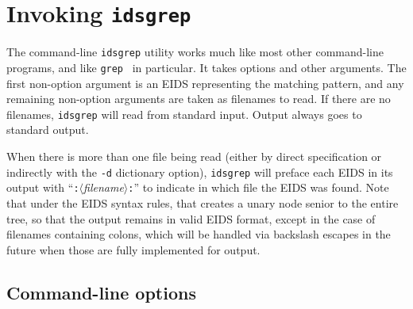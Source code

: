 \documentclass[twocolumn]{report}
\begin{document}

\chapter{Invoking \texttt{idsgrep}}

The command-line \texttt{idsgrep} utility works much like most other
command-line programs, and like \texttt{grep}~\cite{grep} in particular.  It
takes options and other arguments.  The first non-option argument is an EIDS
representing the matching pattern, and any remaining non-option arguments
are taken as filenames to read.  If there are no filenames, \texttt{idsgrep}
will read from standard input.  Output always goes to standard output.

When there is more than one file being read (either by direct specification
or indirectly with the \texttt{-d} dictionary option), \texttt{idsgrep} will
preface each EIDS in its output with
``\texttt{:}$\langle$\textit{filename}$\rangle$\texttt{:}'' to indicate
in which file the EIDS was found.  Note that under the EIDS syntax rules,
that creates a unary node senior to the entire tree, so that the output
remains in valid EIDS format, except in the case of filenames containing
colons, which will be handled via backslash escapes in the future when those
are fully implemented for output.


\section{Command-line options}
\end{document}

